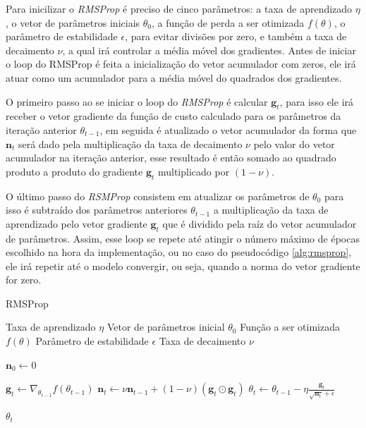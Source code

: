 Para inicilizar o \textit{RMSProp} é preciso de cinco parâmetros: a taxa de aprendizado $\eta$, o vetor de parâmetros iniciais $\theta_0$, a função de perda a ser otimizada $f(\theta)$, o parâmetro de estabilidade $\epsilon$, para evitar divisões por zero, e também a taxa de decaimento $\nu$, a qual irá controlar a média móvel dos gradientes. Antes de iniciar o loop do RMSProp é feita a inicialização do vetor acumulador com zeros, ele irá atuar como um acumulador para a média móvel do quadrados dos gradientes.

O primeiro passo ao se iniciar o loop do \textit{RMSProp} é calcular $\textbf{g}_t$, para isso ele irá receber o vetor gradiente da função de custo calculado para os parâmetros da iteração anterior $\theta_{t-1}$, em seguida é atualizado o vetor acumulador da forma que $\textbf{n}_t$ será dado pela multiplicação da taxa de decaimento $\nu$ pelo valor do vetor acumulador na iteração anterior, esse resultado é então somado ao quadrado produto a produto do gradiente $\textbf{g}_t$ multiplicado por $(1 - \nu)$.

O último passo do \textit{RSMProp} consistem em atualizar os parâmetros de $\theta_0$ para isso é subtraído dos parâmetros anteriores $\theta_{t-1}$ a multiplicação da taxa de aprendizado pelo vetor gradiente $\textbf{g}_t$ que é dividido pela raíz do vetor acumulador de parâmetros. Assim, esse loop se repete até atingir o número máximo de épocas escolhido na hora da implementação, ou no caso do pseudocódigo \ref{alg:rmsprop}, ele irá repetir até o modelo convergir, ou seja, quando a norma do vetor gradiente for zero.

\begin{algorithm}[H] %
    \caption{RMSProp}
    \label{alg:rmsprop}
    \begin{algorithmic}[1] %

    \Require Taxa de aprendizado $\eta$
    \Require Vetor de parâmetros inicial $\theta_0$
    \Require Função a ser otimizada $f(\theta)$
    \Require Parâmetro de estabilidade $\epsilon$
    \Require Taxa de decaimento $\nu$

    \State $\mathbf{n}_0 \leftarrow 0$ 

        \State $\textbf{g}_t \leftarrow \nabla_{\theta_{t-1}} f(\theta_{t-1})$
        \State $\textbf{n}_t \leftarrow \nu \textbf{n}_{t-1} + (1 - \nu) (\mathbf{g}_t \odot \mathbf{g}_t)$
        \State $\theta_t \leftarrow \theta_{t-1} - \eta \frac{\textbf{g}_t}{\sqrt{\textbf{n}_t} + \epsilon}$
    \EndWhile

    \State \Return $\theta_t$ 
    \end{algorithmic}
\end{algorithm}

